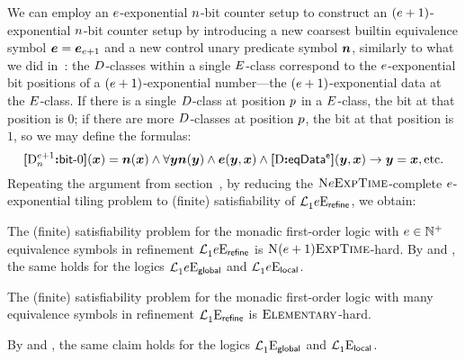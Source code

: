 We can employ an $e$-exponential $n$-bit counter setup to construct an
$(e+1)$-exponential $n$-bit counter setup by introducing a new coarsest
builtin equivalence symbol $\bm{e} = \bm{e}_{e+1}$ and a new control unary
predicate symbol $\bm{n}$, similarly to what we did in~:
the $D$-classes within a single $E$-class correspond to the
$e$-exponential bit positions of a $(e+1)$-exponential number---the
$(e+1)$-exponential data at the $E$-class. If there is a single
$D$-class at position $p$ in a $E$-class, the bit at that position
is $0$; if there are more $D$-classes at position $p$, the bit at that
position is $1$, so we may define the formulas:
\[
  {\bm{[}\mathrm{D}_n^{e+1}\mathord{\bm{:}}\mathsf{bit}{\hbox{-}}0\bm{]}}(\bm{x}) = \bm{n}(\bm{x}) \land \forall\bm{y} \bm{n}(\bm{y}) \land
  \bm{e}(\bm{y},\bm{x}) \land {\bm{[}\mathrm{D}\mathord{\bm{:}}\mathsf{eqData^{e}}\bm{]}}(\bm{y},\bm{x}) \rightarrow \bm{y} = \bm{x}, \text{etc.}
\]
Repeating the argument from section~, by reducing the
$\text{\normalfont{\scshape N}}e\text{\normalfont{\scshape ExpTime}}$-complete $e$-exponential tiling problem to (finite)
satisfiability of $\mathcal{L}^{{}}_{1}{e}\mathrm{E}_{\mathsf{refine}}$, we obtain:
\begin{proposition}
The (finite) satisfiability problem for the monadic first-order logic with
$e \in \mathbb{N}^{+}$ equivalence symbols in refinement
$\mathcal{L}^{{}}_{1}{e}\mathrm{E}_{\mathsf{refine}}$ is $\text{\normalfont{\scshape N}}(e+1)\text{\normalfont{\scshape ExpTime}}$-hard.
By  and , the same
holds for the logics $\mathcal{L}^{{}}_{1}{e}\mathrm{E}_{\mathsf{global}}$ and
$\mathcal{L}^{{}}_{1}{e}\mathrm{E}_{\mathsf{local}}$.
\end{proposition}

\begin{proposition}
The (finite) satisfiability problem for the monadic first-order logic with many
equivalence symbols in refinement $\mathcal{L}^{{}}_{1}{{}}\mathrm{E}_{\mathsf{refine}}$ is
$\text{\normalfont{\scshape Elementary}}$-hard.

By  and , the same claim
holds for the logics $\mathcal{L}^{{}}_{1}{{}}\mathrm{E}_{\mathsf{global}}$ and
$\mathcal{L}^{{}}_{1}{{}}\mathrm{E}_{\mathsf{local}}$.
\end{proposition}